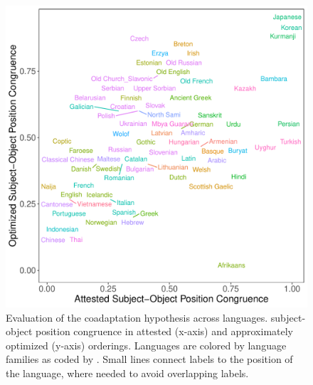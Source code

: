 \documentclass[9pt,twocolumn,twoside,lineno]{pnas-new}
\begin{document}
\begin{figure}[h!]
    \centering
    \includegraphics[width=.8\textwidth]{../analysis/figures/fracion-optimized_DLM_2.6_format.pdf}
	\caption{Evaluation of the coadaptation hypothesis across languages. subject-object position congruence in attested (x-axis) and approximately optimized (y-axis) orderings. Languages are colored by language families as coded by \cite{zeman2020universal}. Small lines connect labels to the position of the language, where needed to avoid overlapping labels.} %
    \label{fig:study1}\label{fig:spoken}
\end{figure}
\end{document}
